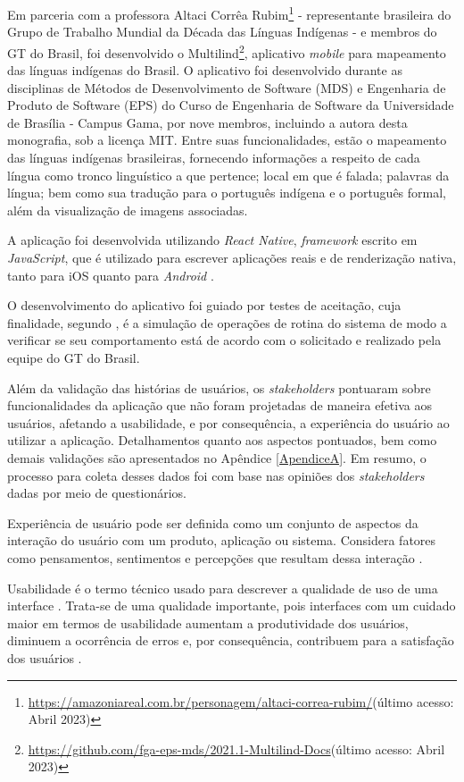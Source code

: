 Em parceria com a professora Altaci Corrêa Rubim\footnote{\url{https://amazoniareal.com.br/personagem/altaci-correa-rubim/}(último acesso: Abril 2023)} - representante
brasileira do Grupo de Trabalho Mundial da Década das Línguas Indígenas - e membros do GT do Brasil, foi desenvolvido o
Multilind\footnote{\url{https://github.com/fga-eps-mds/2021.1-Multilind-Docs}(último acesso: Abril 2023)}, aplicativo \textit{mobile} para mapeamento das línguas
indígenas do Brasil. O aplicativo foi desenvolvido durante as disciplinas de Métodos de Desenvolvimento de Software (MDS) e Engenharia de Produto de Software (EPS) do
Curso de Engenharia de Software da Universidade de Brasília - Campus Gama, por nove membros, incluindo a autora desta monografia, sob a licença MIT. Entre suas funcionalidades, estão o mapeamento das línguas
indígenas brasileiras, fornecendo informações a respeito de cada língua como tronco linguístico a que pertence; local em que é falada; palavras da língua; bem como sua
tradução para o português indígena e o português formal, além da visualização de imagens associadas.

A aplicação foi desenvolvida utilizando \textit{React Native}, \textit{framework} escrito em \textit{JavaScript}, que é utilizado para escrever aplicações reais e de
renderização nativa, tanto para iOS quanto para \textit{Android} \cite{eiseman2017}.

O desenvolvimento do aplicativo foi guiado por testes de aceitação, cuja finalidade, segundo , é a simulação de operações de rotina do sistema de
modo a verificar se seu comportamento está de acordo com o solicitado e realizado pela equipe do GT do Brasil.

Além da validação das histórias de usuários, os \textit{stakeholders} pontuaram sobre funcionalidades da aplicação que não foram projetadas de maneira efetiva aos
usuários, afetando a usabilidade, e por consequência, a experiência do usuário ao utilizar a aplicação. Detalhamentos quanto aos aspectos pontuados, bem como demais validações 
são apresentados no Apêndice \ref{ApendiceA}. Em resumo, o processo para coleta desses dados foi com base nas opiniões dos \textit{stakeholders} dadas por meio de questionários.

Experiência de usuário pode ser definida como um conjunto de aspectos da interação do usuário com um produto, aplicação ou sistema. Considera fatores como pensamentos,
sentimentos e percepções que resultam dessa interação \cite{tulis2013}.

Usabilidade é o termo técnico usado para descrever a qualidade de uso de uma interface \cite{bevan1995}. Trata-se de uma qualidade importante, pois interfaces com um
cuidado maior em termos de usabilidade aumentam a produtividade dos usuários, diminuem a ocorrência de erros e, por consequência, contribuem para a satisfação dos
usuários \cite{winckler2022}.

